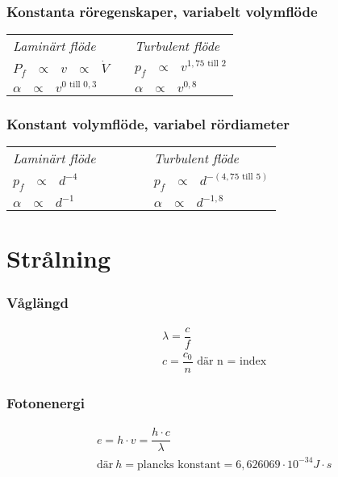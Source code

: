 \subsubsection*{Konstanta röregenskaper, variabelt volymflöde}
\begin{tabularx}{\linewidth} { l l l}
	\textit{Laminärt flöde} &   & \textit{Turbulent flöde} \\ 
  $P_f \text{ } \propto \text{ } v \text{ } \propto \text{ } \dot{V}$ &&  $p_f \text{ } \propto \text{ } v^{1,75 \text{ till } 2}$\\
  $\alpha \text{ } \propto \text{ } v^{0 \text{ till } 0,3}$ &&  $\alpha \text{ } \propto \text{ } v^{0,8}$\\
	\end{tabularx}
\subsubsection*{Konstant volymflöde, variabel rördiameter}
\begin{tabularx}{\linewidth} {l l l} 
	\textit{Laminärt flöde} & ~~~~~  & \textit{Turbulent flöde} \\ 
	$p_f \text{ } \propto \text{ } d^{-4}$ && $p_f \text{ } \propto \text{ } d^{-(4,75 \text{ till } 5)}$\\
		$\alpha \text{ } \propto \text{ } d^{-1}$ && $\alpha \text{ } \propto \text{ } d^{-1,8}$\\
		\end{tabularx}
\section*{Strålning}
\subsubsection*{Våglängd}
\begin{align*}
	&\lambda = \dfrac{c}{f} \\
	& c = \dfrac{c_{0}}{n} \text{ där n = index}
\end{align*}
\subsubsection*{Fotonenergi}
\begin{align*}
	& e = h \cdot v = \dfrac{h \cdot c}{\lambda}\\
	& \text{där} \ h = \text{plancks konstant} = 6,626069 \cdot 10^{-34} J \cdot s
\end{align*}
